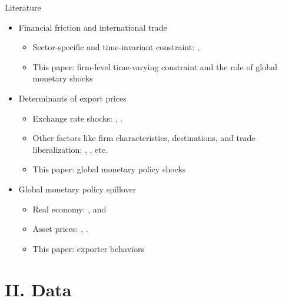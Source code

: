 \documentclass[10pt]{beamer}
\begin{document}
\begin{frame}{Literature}

\begin{itemize}
    \item Financial friction and international trade
    \begin{itemize}
        \item Sector-specific and time-invariant constraint: \cite{manova2013credit}, \cite{lin2018international}
        \item This paper: firm-level time-varying constraint and the role of global monetary shocks
    \end{itemize}
    \item Determinants of export prices
        \begin{itemize}
        \item  Exchange rate shocks: \cite{amiti2014importers}, \cite{auer2018quality}.
        \item Other factors like firm characteristics, destinations, and trade liberalization:  \cite{manova2012export}, \cite{fan2015trade}, etc.
        \item This paper: global monetary policy shocks
    \end{itemize}
    \item Global monetary policy spillover
        \begin{itemize}
        \item Real economy: \cite{bluedorn2011open},  and \cite{di2023impact}
        \item Asset prices: \cite{rogers2014evaluating}, \cite{miranda2020us}.
        \item This paper: exporter behaviors
    \end{itemize}
    \medskip

\end{itemize}

\end{frame}

\section{II. Data}
\end{document}
